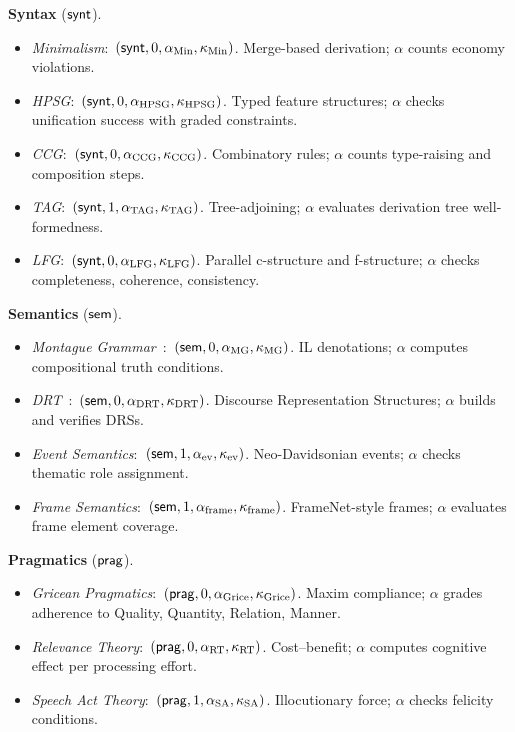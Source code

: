 \noindent\textbf{Syntax} ($\mathsf{synt}$).
\begin{itemize}[nosep]
\item \emph{Minimalism}:\ $({\mathsf{synt}}, 0, \alpha_{\mathrm{Min}},
  \kappa_{\mathrm{Min}})$.  Merge-based derivation; $\alpha$
  counts economy violations.
\item \emph{HPSG}:\ $({\mathsf{synt}}, 0, \alpha_{\mathrm{HPSG}},
  \kappa_{\mathrm{HPSG}})$.  Typed feature structures; $\alpha$
  checks unification success with graded constraints.
\item \emph{CCG}:\ $({\mathsf{synt}}, 0, \alpha_{\mathrm{CCG}},
  \kappa_{\mathrm{CCG}})$.  Combinatory rules; $\alpha$ counts
  type-raising and composition steps.
\item \emph{TAG}:\ $({\mathsf{synt}}, 1, \alpha_{\mathrm{TAG}},
  \kappa_{\mathrm{TAG}})$.  Tree-adjoining; $\alpha$ evaluates
  derivation tree well-formedness.
\item \emph{LFG}:\ $({\mathsf{synt}}, 0, \alpha_{\mathrm{LFG}},
  \kappa_{\mathrm{LFG}})$.  Parallel c-structure and f-structure;
  $\alpha$ checks completeness, coherence, consistency.
\end{itemize}

\noindent\textbf{Semantics} ($\mathsf{sem}$).
\begin{itemize}[nosep]
\item \emph{Montague Grammar}~\cite{montague1973}:\ $({\mathsf{sem}}, 0,
  \alpha_{\mathrm{MG}}, \kappa_{\mathrm{MG}})$.  IL denotations;
  $\alpha$ computes compositional truth conditions.
\item \emph{DRT}~\cite{kamp1993}:\ $({\mathsf{sem}}, 0,
  \alpha_{\mathrm{DRT}}, \kappa_{\mathrm{DRT}})$.  Discourse
  Representation Structures; $\alpha$ builds and verifies DRSs.
\item \emph{Event Semantics}:\ $({\mathsf{sem}}, 1,
  \alpha_{\mathrm{ev}}, \kappa_{\mathrm{ev}})$.  Neo-Davidsonian
  events; $\alpha$ checks thematic role assignment.
\item \emph{Frame Semantics}:\ $({\mathsf{sem}}, 1,
  \alpha_{\mathrm{frame}}, \kappa_{\mathrm{frame}})$.
  FrameNet-style frames; $\alpha$ evaluates frame element coverage.
\end{itemize}

\noindent\textbf{Pragmatics} ($\mathsf{prag}$).
\begin{itemize}[nosep]
\item \emph{Gricean Pragmatics}:\ $({\mathsf{prag}}, 0,
  \alpha_{\mathrm{Grice}}, \kappa_{\mathrm{Grice}})$.
  Maxim compliance; $\alpha$ grades adherence to Quality, Quantity,
  Relation, Manner.
\item \emph{Relevance Theory}:\ $({\mathsf{prag}}, 0,
  \alpha_{\mathrm{RT}}, \kappa_{\mathrm{RT}})$.
  Cost--benefit; $\alpha$ computes cognitive effect per processing
  effort.
\item \emph{Speech Act Theory}:\ $({\mathsf{prag}}, 1,
  \alpha_{\mathrm{SA}}, \kappa_{\mathrm{SA}})$.
  Illocutionary force; $\alpha$ checks felicity conditions.
\end{itemize}

